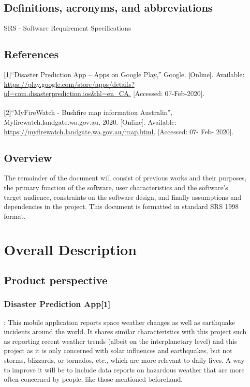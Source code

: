\documentclass{article}
\begin{document}
\subsection{Definitions, acronyms, and abbreviations}
SRS - Software Requirement Specifications

\subsection{References}
[1]“Disaster Prediction App – Apps on Google Play,” Google. [Online]. 
Available: \url{ https://play.google.com/store/apps/details?id=com.disasterprediction.ios&hl=en_CA.} [Accessed: 07-Feb-2020]. \\\\
 
[2]“MyFireWatch - Bushfire map information Australia”, Myfirewatch.landgate.wa.gov.au, 2020. [Online].
 Available: \url{ https://myfirewatch.landgate.wa.gov.au/map.html.} [Accessed: 07- Feb- 2020].

 \subsection{Overview}
 The remainder of the document will consist of previous works and their purposes, 
 the primary function of the software, user characteristics and the software’s 
 target audience, constraints on the software design, and finally assumptions and 
 dependencies in the project. This document is formatted in standard SRS 1998 format.

  
\section{Overall Description}
\subsection{Product perspective}
\subsubsection*{Disaster Prediction App[1]} :
    This mobile application reports space weather changes as well as earthquake 
    incidents around the world. It shares similar characteristics with this project 
    such as reporting recent weather trends (albeit on the interplanetary level) and 
    this project as it is only concerned with solar influences and earthquakes, but 
    not storms, blizzards, or tornados, etc., which are more relevant to daily lives. 
    A way to improve it will be to include data reports on hazardous weather that are 
    more often concerned by people, like those mentioned beforehand.
 
\end{document}
